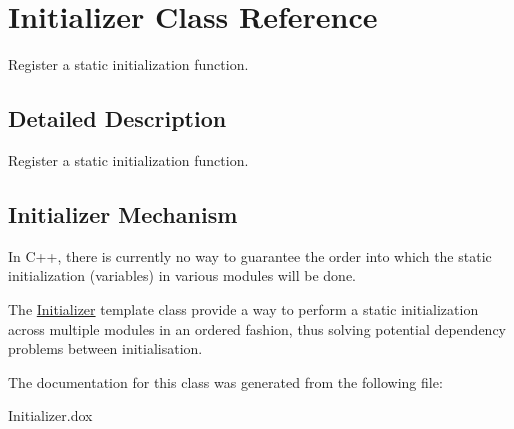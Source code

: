 \hypertarget{classInitializer}{\section{Initializer Class Reference}
\label{classInitializer}
}


Register a static initialization function.  




\subsection{Detailed Description}
Register a static initialization function. 

\hypertarget{classInitializer_secInitializerMechanism}{}\subsection{Initializer Mechanism}\label{classInitializer_secInitializerMechanism}
In C++, there is currently no way to guarantee the order into which the static initialization (variables) in various modules will be done.

The \hyperlink{classInitializer}{Initializer} template class provide a way to perform a static initialization across multiple modules in an ordered fashion, thus solving potential dependency problems between initialisation. 

The documentation for this class was generated from the following file\-:\begin{DoxyCompactItemize}
\item 
Initializer.\-dox\end{DoxyCompactItemize}
